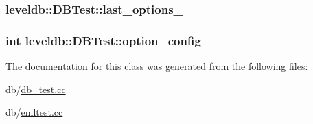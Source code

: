 \subsubsection[{last\+\_\+options\+\_\+}]{ leveldb\+::\+D\+B\+Test\+::last\+\_\+options\+\_\+}\label{classleveldb_1_1_d_b_test_adc05df912917d8de411d0672af04330f}
\hypertarget{classleveldb_1_1_d_b_test_a3cc39d9674e4e47e2be82b023f791bd0}{}
\subsubsection[{option\+\_\+config\+\_\+}]{\setlength{\rightskip}{0pt plus 5cm}int leveldb\+::\+D\+B\+Test\+::option\+\_\+config\+\_\+\hspace{0.3cm}{\ttfamily [private]}}\label{classleveldb_1_1_d_b_test_a3cc39d9674e4e47e2be82b023f791bd0}


The documentation for this class was generated from the following files\+:\begin{DoxyCompactItemize}
\item 
db/\hyperlink{db__test_8cc}{db\+\_\+test.\+cc}\item 
db/\hyperlink{emltest_8cc}{emltest.\+cc}\end{DoxyCompactItemize}
